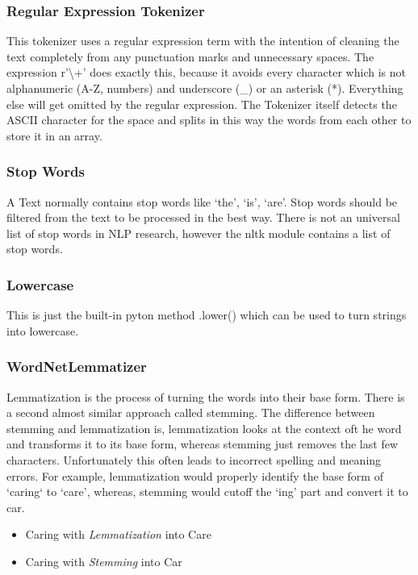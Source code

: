 \subsubsection{Regular Expression Tokenizer}
This  tokenizer uses a regular expression term with the intention of cleaning the text completely from any punctuation marks and unnecessary spaces.  The expression r'\textbackslash +' does exactly this, because it avoids every character which is not alphanumeric (A-Z, numbers) and underscore (\_) or an asterisk (*). Everything else will get omitted by the regular expression. The Tokenizer itself detects the ASCII character for the space and splits in this way the words from each other to store it in an array.

\subsubsection{Stop Words}
A Text normally contains stop words like ‘the’, ‘is’, ‘are’. Stop words should be filtered from the text to be processed in the best way. There is not an universal list of stop words in NLP research, however the nltk module contains a list of stop words.

\subsubsection{Lowercase}
This is just the built-in pyton method .lower() which can be used to turn strings into lowercase.

\subsubsection{WordNetLemmatizer}
Lemmatization is the process of turning the words into their base form. There is a second almost similar approach called stemming. 
The difference between stemming and lemmatization is, lemmatization looks at the context oft he word and transforms it to its base form, whereas stemming just removes the last few characters. Unfortunately this often leads to incorrect spelling and meaning errors. For example, lemmatization would properly identify the base form of ‘caring‘ to ‘care’, whereas, stemming would cutoff the ‘ing’ part and convert it to car.
\begin{itemize}
\item Caring with \textit{Lemmatization} into Care
\item Caring with \textit{Stemming} into Car
\end{itemize}

